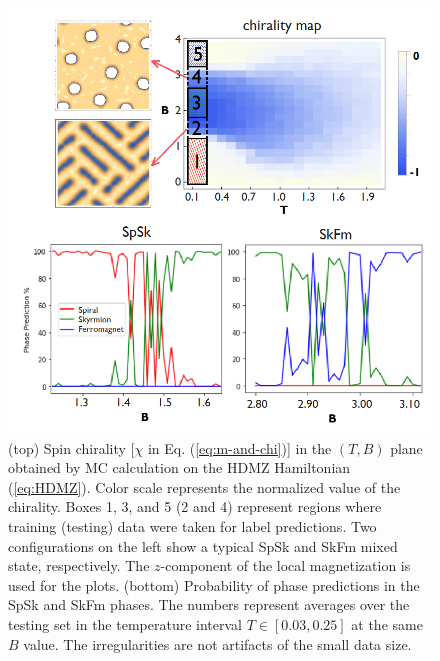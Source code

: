 \documentclass[reprint,amsmath,amssymb,aps,showpacs,superscriptaddress,prl]{revtex4-1}
\begin{document}
\begin{figure}[h]
\includegraphics[scale=0.5]{fig2.png}
\caption{(top) Spin chirality [$\chi$ in Eq. (\ref{eq:m-and-chi})] in the $(T,B)$ plane obtained by MC calculation on the HDMZ Hamiltonian (\ref{eq:HDMZ}). Color scale represents the normalized value of the chirality. Boxes 1, 3, and 5 (2 and 4) represent regions where training (testing) data were taken for label predictions. Two configurations on the left show a typical SpSk and SkFm mixed state, respectively. The $z$-component of the local magnetization is used for the plots. (bottom) Probability of phase predictions in the SpSk and SkFm phases. The numbers represent averages over the testing set in the temperature interval $T\in[0.03,0.25]$ at the same $B$ value. The irregularities are not artifacts of the small data size.}\label{fig:2}
\end{figure}
\end{document}

